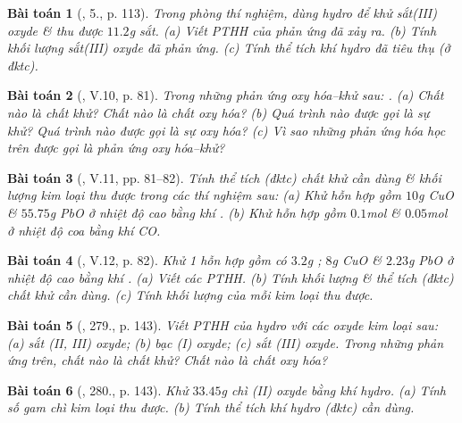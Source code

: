 \documentclass{article}
\newtheorem{baitoan}{Bài toán}
\begin{document}
\begin{baitoan}[\cite{SGK_Hoa_Hoc_8}, 5., p. 113]
	Trong phòng thí nghiệm, dùng hydro để khử sắt(III) oxyde \& thu được $11.2$\emph{g} sắt. (a) Viết PTHH của phản ứng đã xảy ra. (b) Tính khối lượng sắt(III) oxyde đã phản ứng. (c) Tính thể tích khí hydro đã tiêu thụ (ở đktc).
\end{baitoan}

\begin{baitoan}[\cite{Truong_BTNC_Hoa_Hoc_8_2022}, V.10, p. 81]
	Trong những phản ứng oxy hóa--khử sau: \emph{}. (a) Chất nào là chất khử? Chất nào là chất oxy hóa? (b) Quá trình nào được gọi là sự khử? Quá trình nào được gọi là sự oxy hóa? (c) Vì sao những phản ứng hóa học trên được gọi là phản ứng oxy hóa--khử? 
\end{baitoan}

\begin{baitoan}[\cite{Truong_BTNC_Hoa_Hoc_8_2022}, V.11, pp. 81--82]
	Tính thể tích (đktc) chất khử cần dùng \& khối lượng kim loại thu được trong các thí nghiệm sau: (a) Khử hỗn hợp gồm $10$\emph{g CuO} \& $55.75$\emph{g PbO} ở nhiệt độ cao bằng khí \emph{}. (b) Khử hỗn hợp gồm $0.1$\emph{mol } \& $0.05$\emph{mol } ở nhiệt độ coa bằng khí \emph{CO}.
\end{baitoan}

\begin{baitoan}[\cite{Truong_BTNC_Hoa_Hoc_8_2022}, V.12, p. 82]
	Khử 1 hỗn hợp gồm có $3.2$\emph{g }; $8$\emph{g CuO} \& $2.23$\emph{g PbO} ở nhiệt độ cao bằng khí \emph{}. (a) Viết các PTHH. (b) Tính khối lượng \& thể tích (đktc) chất khử cần dùng. (c) Tính khối lượng của mỗi kim loại thu được.
\end{baitoan}

\begin{baitoan}[\cite{An_400_BT_Hoa_Hoc_8_2020}, 279., p. 143]
	Viết PTHH của hydro với các oxyde kim loại sau: (a) sắt (II, III) oxyde; (b) bạc (I) oxyde; (c) sắt (III) oxyde. Trong những phản ứng trên, chất nào là chất khử? Chất nào là chất oxy hóa?
\end{baitoan}

\begin{baitoan}[\cite{An_400_BT_Hoa_Hoc_8_2020}, 280., p. 143]
	Khử $33.45$\emph{g} chì (II) oxyde bằng khí hydro. (a) Tính số gam chì kim loại thu được. (b) Tính thể tích khí hydro (đktc) cần dùng.
\end{baitoan}
\end{document}
